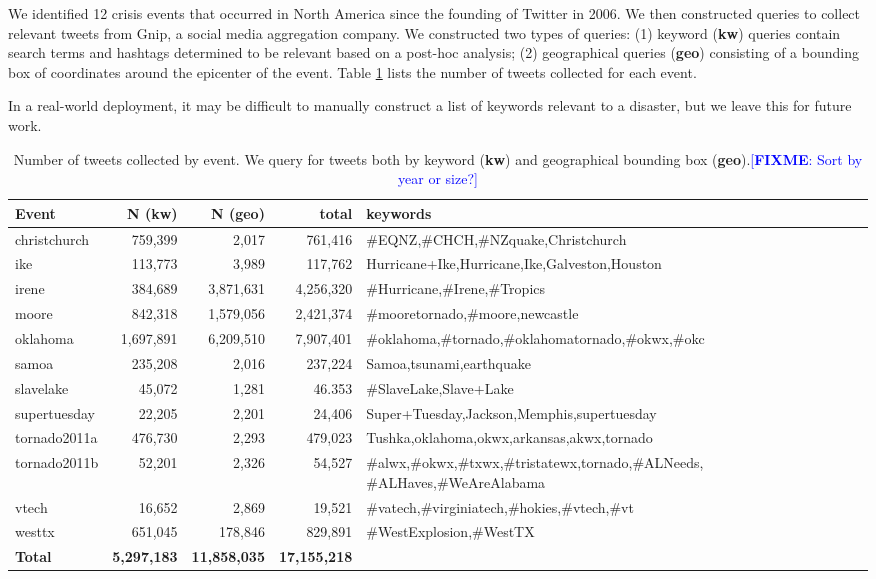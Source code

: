 \documentclass{article}
\newcommand{\FIXME}[1]{\textcolor{blue}{[\textbf{FIXME}: {#1}]}}
\begin{document}
We identified 12 crisis events that occurred in North America since the
founding of Twitter in 2006. We then constructed queries to collect relevant
tweets from Gnip, a social media aggregation company. We constructed two types
of queries: (1) keyword ({\bf kw}) queries contain search terms and hashtags
determined to be relevant based on a post-hoc analysis; (2) geographical
queries ({\bf geo}) consisting of a bounding box of coordinates around the
epicenter of the event. Table \ref{tab.data_summary} lists the number of
tweets collected for each event.

In a real-world deployment, it may be difficult to manually construct a list
of keywords relevant to a disaster, but we leave this for future work.

\begin{table}
\centering
\small
\begin{tabular}{|l|r|r|r| p{8cm} |}
\hline
{\bf Event}  & {\bf N (kw)} & {\bf N (geo)} & {\bf total} & {\bf keywords} \\
\hline
christchurch &  759,399  & 2,017       &  761,416    & \#EQNZ,\#CHCH,\#NZquake,Christchurch\\
ike          &  113,773  & 3,989       &  117,762    & Hurricane+Ike,Hurricane,Ike,Galveston,Houston\\
irene        &  384,689  & 3,871,631   &  4,256,320  & \#Hurricane,\#Irene,\#Tropics\\
moore        &  842,318  & 1,579,056   &  2,421,374  & \#mooretornado,\#moore,newcastle\\
oklahoma     & 1,697,891 & 6,209,510   &  7,907,401  & \#oklahoma,\#tornado,\#oklahomatornado,\#okwx,\#okc\\
samoa        & 235,208   &  2,016      &  237,224    &  Samoa,tsunami,earthquake\\
slavelake    & 45,072    &  1,281      &  46.353     & \#SlaveLake,Slave+Lake\\
supertuesday & 22,205    &  2,201      &  24,406     & Super+Tuesday,Jackson,Memphis,supertuesday\\
tornado2011a & 476,730   &  2,293      &  479,023    & Tushka,oklahoma,okwx,arkansas,akwx,tornado\\
tornado2011b & 52,201    &  2,326      &  54,527     & \#alwx,\#okwx,\#txwx,\#tristatewx,tornado,\mbox{\#ALNeeds}, \#ALHaves,\#WeAreAlabama\\
vtech        & 16,652    &  2,869      &  19,521     & \#vatech,\#virginiatech,\#hokies,\#vtech,\#vt\\
westtx       & 651,045   &  178,846    &  829,891    & \#WestExplosion,\#WestTX\\
\hline
{\bf Total}  & {\bf 5,297,183} & {\bf 11,858,035}  & {\bf 17,155,218}  &\\
\hline
\end{tabular}
\caption{Number of tweets collected by event. We query for tweets both by
  keyword ({\bf kw}) and geographical bounding box ({\bf geo}).\FIXME{Sort by
    year or size?}\label{tab.data_summary}}
\end{table}
\end{document}

